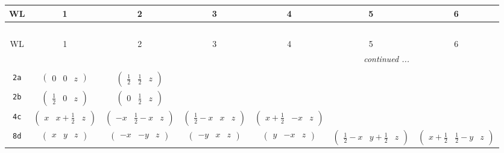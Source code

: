 \documentclass[fleqn,9pt,landscape]{jsarticle}
\begin{document}
\begin{center}
\renewcommand{\arraystretch}{1.2}
\begin{longtable}{ccccccc}
 \hline \hline
WL & 1 & 2 & 3 & 4 & 5 & 6 \\ \hline \endfirsthead

\multicolumn{6}{l}{\tablename\ \thetable{}} \\
 \hline \hline
WL & 1 & 2 & 3 & 4 & 5 & 6 \\ \hline \endhead

 \hline \hline
\multicolumn{6}{r}{\footnotesize\it continued ...} \\ \endfoot

 \hline \hline
\multicolumn{6}{r}{} \\ \endlastfoot

{\tt 2a} & $ \begin{pmatrix} 0 & 0 & z \end{pmatrix} $ & $ \begin{pmatrix} \frac{1}{2} & \frac{1}{2} & z \end{pmatrix} $ & $  $ & $  $ & $  $ & $  $ \\ \hline
{\tt 2b} & $ \begin{pmatrix} \frac{1}{2} & 0 & z \end{pmatrix} $ & $ \begin{pmatrix} 0 & \frac{1}{2} & z \end{pmatrix} $ & $  $ & $  $ & $  $ & $  $ \\ \hline
{\tt 4c} & $ \begin{pmatrix} x & x + \frac{1}{2} & z \end{pmatrix} $ & $ \begin{pmatrix} - x & \frac{1}{2} - x & z \end{pmatrix} $ & $ \begin{pmatrix} \frac{1}{2} - x & x & z \end{pmatrix} $ & $ \begin{pmatrix} x + \frac{1}{2} & - x & z \end{pmatrix} $ & $  $ & $  $ \\ \hline
{\tt 8d} & $ \begin{pmatrix} x & y & z \end{pmatrix} $ & $ \begin{pmatrix} - x & - y & z \end{pmatrix} $ & $ \begin{pmatrix} - y & x & z \end{pmatrix} $ & $ \begin{pmatrix} y & - x & z \end{pmatrix} $ & $ \begin{pmatrix} \frac{1}{2} - x & y + \frac{1}{2} & z \end{pmatrix} $ & $ \begin{pmatrix} x + \frac{1}{2} & \frac{1}{2} - y & z \end{pmatrix} $ \\

\end{longtable}
\end{center}
\end{document}
